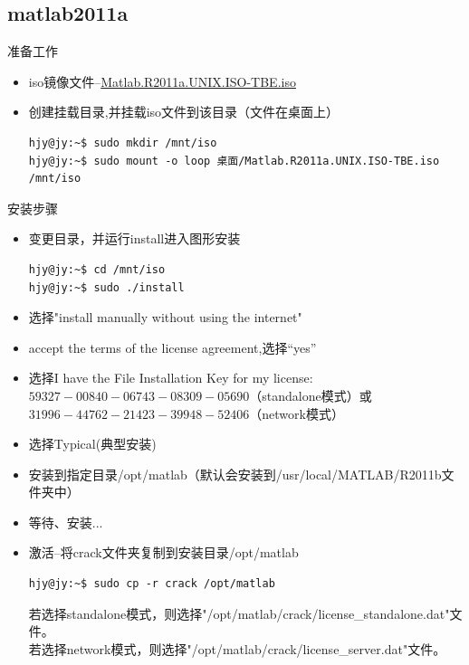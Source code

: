 \subsection{matlab2011a}
准备工作\\
\begin{itemize}
\item iso镜像文件--\href{http://url.cn/Ius1xq}{Matlab.R2011a.UNIX.ISO-TBE.iso}
\item 创建挂载目录,并挂载iso文件到该目录（文件在桌面上）
\begin{lstlisting}[style=BASH]
hjy@jy:~$ sudo mkdir /mnt/iso
hjy@jy:~$ sudo mount -o loop 桌面/Matlab.R2011a.UNIX.ISO-TBE.iso /mnt/iso
\end{lstlisting}
\end{itemize} 
安装步骤\\
\begin{itemize}
\item 变更目录，并运行install进入图形安装
\begin{lstlisting}[style=BASH]
hjy@jy:~$ cd /mnt/iso
hjy@jy:~$ sudo ./install
\end{lstlisting}
\item 选择"install manually without using the internet"
\item accept the terms of the license agreement,选择“yes”
\item 选择I have the File Installation Key for my license:$59327-00840-06743-08309-05690$（standalone模式）或$31996-44762-21423-39948-52406$（network模式）
\item 选择Typical(典型安装)
\item 安装到指定目录/opt/matlab（默认会安装到/usr/local/MATLAB/R2011b文件夹中）
\item 等待、安装...
\item 激活--将crack文件夹复制到安装目录/opt/matlab
\begin{lstlisting}[style=BASH]
hjy@jy:~$ sudo cp -r crack /opt/matlab
\end{lstlisting}
若选择standalone模式，则选择"/opt/matlab/crack/license\_{}standalone.dat"文件。\\
若选择network模式，则选择"/opt/matlab/crack/license\_{}server.dat"文件。\\
\end{itemize} 


